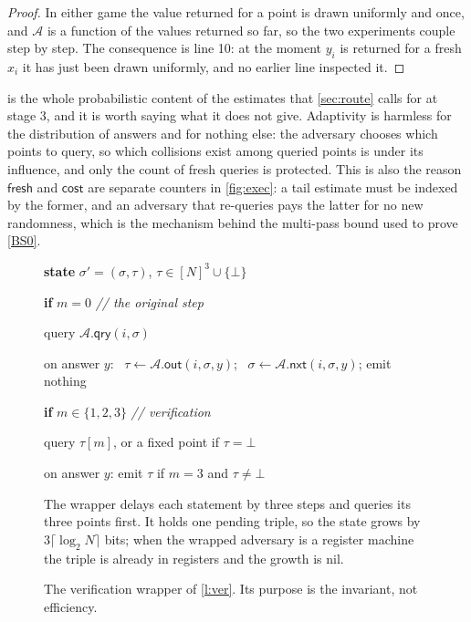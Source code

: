 \documentclass[11pt]{article}
\theoremstyle{plain}
\theoremstyle{definition}
\newcommand{\NN}{[N]}
\newcommand{\advers}{\mathcal{A}}
\newcommand{\qry}{\mathsf{qry}}
\newcommand{\nxt}{\mathsf{nxt}}
\newcommand{\outp}{\mathsf{out}}
\newcommand{\Ver}{\mathsf{Ver}}
\newcommand{\gname}[1]{\underline{\smash{#1}}\vspace{2pt}}
\begin{document}
\begin{proof}
In either game the value returned for a point is drawn uniformly and once,
and $\advers$ is a function of the values returned so far, so the two
experiments couple step by step.  The consequence is line 10: at the moment
$y_{i}$ is returned for a fresh $x_{i}$ it has just been drawn uniformly,
and no earlier line inspected it.
\end{proof}

 is the whole probabilistic content of the estimates that
\cref{sec:route} calls for at stage 3, and it is worth saying what it does
not give.  Adaptivity is harmless for the distribution of answers and for
nothing else: the adversary chooses which points to query, so which
collisions exist among queried points is under its influence, and only the
count of fresh queries is protected.  This is also the reason
$\mathsf{fresh}$ and $\mathsf{cost}$ are separate counters in
\cref{fig:exec}: a tail estimate must be indexed by the former, and an
adversary that re-queries pays the latter for no new randomness, which is
the mechanism behind the multi-pass bound used to prove \cref{BS0}.

\begin{figure}[t]
\begin{minipage}[t]{0.53\textwidth}
\begin{gbox}
\gname{$\mathsf{adversary}~\Ver[\advers]$, at step $4(i-1)+1+m$}
\begin{pc}
\item \textbf{state} $\sigma' = (\sigma,\tau)$,
  $\tau \in \NN^{3}\cup\{\bot\}$
\item \textbf{if} $m = 0$ \quad \emph{// the original step}
\item \quad query $\advers.\qry(i,\sigma)$
\item \quad on answer $y$: \ $\tau \gets \advers.\outp(i,\sigma,y)$;
  \ $\sigma \gets \advers.\nxt(i,\sigma,y)$; emit nothing
\item \textbf{if} $m \in \{1,2,3\}$ \quad \emph{// verification}
\item \quad query $\tau[m]$, or a fixed point if $\tau = \bot$
\item \quad on answer $y$: emit $\tau$ if $m=3$ and $\tau \neq \bot$
\end{pc}
\end{gbox}
\end{minipage}\hfill
\begin{minipage}[t]{0.43\textwidth}
\small
The wrapper delays each statement by three steps and queries its three
points first.  It holds one pending triple, so the state grows by
$3\lceil\log_{2}N\rceil$ bits; when the wrapped adversary is a register
machine the triple is already in registers and the growth is nil.
\end{minipage}
\caption{The verification wrapper of \cref{l:ver}.  Its purpose is the
invariant, not efficiency.}
\label{fig:ver}
\end{figure}
\end{document}
